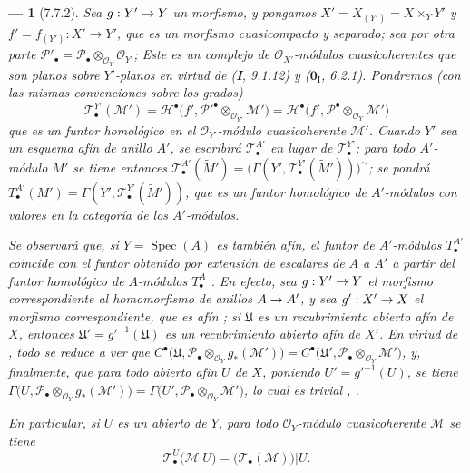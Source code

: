 \documentclass[10pt,oneside,openany]{book}
\theoremstyle{egaenv}\newtheorem*{env}{---}
\theoremstyle{egastatement}
\theoremstyle{egadescription}
\renewcommand{\to}{\mathchoice{\longrightarrow}{\rightarrow}{\rightarrow}{\rightarrow}}
\begin{document}
\begin{env}[7.7.2]
\label{III.7.7.2}
Sea $g:Y'\to Y$ un morfismo, y pongamos
$X'=X_{(Y')}=X\times_Y Y'$ y $f'=f_{(Y')}:X'\longrightarrow Y'$,
que es un morfismo cuasicompacto y separado; sea por otra parte
$\mathscr P'_\bullet=\mathscr P_\bullet\otimes_{\mathscr O_Y}\mathscr O_{Y'}$;
Este es un complejo de $\mathscr O_{X'}$-módulos cuasicoherentes que son \emph{planos}
sobre $Y'$-\emph{planos} en virtud de (\textbf{I}, 9.1.12) y ($\mathbf{0}_{\mathrm I}$, 6.2.1). Pondremos
(con las mismas convenciones sobre los grados)
\[
  \mathscr T^{Y'}_\bullet(\mathscr M')
  =\mathscr H^\bullet
    \bigl(f',\mathscr P'^\bullet\otimes_{\mathscr O_{Y'}}\mathscr M'\bigr)
  =\mathscr H^\bullet
    \bigl(f',\mathscr P^\bullet\otimes_{\mathscr O_Y}\mathscr M'\bigr)
  \tag{7.7.2.1}\label{III.7.7.2.1.fr}
\]
que es un funtor homológico en el $\mathscr O_{Y'}$-módulo cuasicoherente
$\mathscr M'$. Cuando $Y'$ sea un esquema afín de anillo $A'$, se escribirá
$\mathscr T^{A'}_\bullet$ en lugar de $\mathscr T^{Y'}_\bullet$; para todo
$A'$-módulo $M'$ se tiene entonces
$\mathscr T^{A'}_\bullet(\widetilde{M}')=\bigl(\Gamma(Y',\mathscr T^{Y'}_\bullet(\widetilde{M}'))\bigr)^\sim$;
se pondrá
$T^{A'}_\bullet(M')=\Gamma(Y',\mathscr T^{Y'}_\bullet(\widetilde{M}'))$,
que es un funtor homológico de $A'$-módulos con valores en la categoría de los
$A'$-módulos.

Se observará que, si $Y=\operatorname{Spec}(A)$ es también afín, el funtor de
$A'$-módulos $T^{A'}_\bullet$ coincide con el funtor obtenido por extensión de
escalares de $A$ a $A'$ a partir del funtor homológico de $A$-módulos
$T^A_\bullet$ . En efecto, sea $g:Y'\to Y$ el morfismo
correspondiente al homomorfismo de anillos $A\to A'$, y sea $g':X'\to X$ el
morfismo correspondiente, que es afín ; si $\mathfrak U$ es
un recubrimiento abierto afín de $X$, entonces
$\mathfrak U'=g'^{-1}(\mathfrak U)$ es un recubrimiento abierto afín de $X'$.
En virtud de , todo se reduce a ver que
$C^\bullet\bigl(\mathfrak U,\mathscr P_\bullet\otimes_{\mathscr O_Y}g_*(\mathscr M')\bigr)=C^\bullet\bigl(\mathfrak U',\mathscr P_\bullet\otimes_{\mathscr O_Y}\mathscr M'\bigr)$,
y, finalmente, que para todo abierto afín $U$ de $X$, poniendo
$U'=g'^{-1}(U)$, se tiene
$\Gamma\bigl(U,\mathscr P_\bullet\otimes_{\mathscr O_Y}g_*(\mathscr M')\bigr)=\Gamma\bigl(U',\mathscr P_\bullet\otimes_{\mathscr O_Y}\mathscr M'\bigr)$,
lo cual es trivial , .

En particular, si $U$ es un abierto de $Y$, para todo
$\mathscr O_Y$-módulo cuasicoherente $\mathscr M$ se tiene
\[
  \mathscr T^U_\bullet(\mathscr M|U)
  =\bigl(\mathscr T_\bullet(\mathscr M)\bigr)|U.
  \tag{7.7.2.2}\label{III.7.7.2.2.fr}
\]
\end{env}
\end{document}
